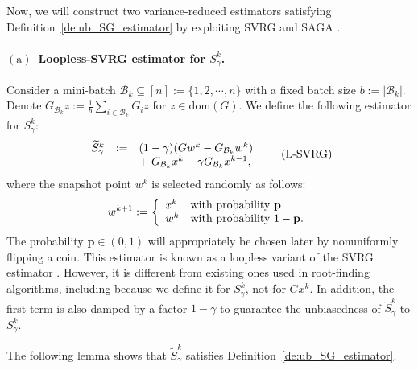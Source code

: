 \documentclass{article}
\newcommand{\sets}[1]{\{#1\}}
\newcommand{\dom}[1]{\mathrm{dom}(#1)}
\newcommand{\Bc}{\mathcal{B}}
\newcommand{\mbf}[1]{\mathbf{#1}}
\newcommand{\beforepara}{\vspace{-1.5ex}}
\theoremstyle{plain}
\theoremstyle{definition}
\theoremstyle{remark}
\begin{document}
Now, we will construct two variance-reduced estimators satisfying Definition~\ref{de:ub_SG_estimator} by exploiting SVRG \citep{SVRG} and SAGA \citep{Defazio2014}. 

\beforepara
\paragraph{$\mathrm{(a)}$~Loopless-SVRG estimator for $S^k_{\gamma}$.}\label{subsec:SVRG_estimator}
Consider a mini-batch $\Bc_k \subseteq [n] := \sets{1,2,\cdots, n}$ with a fixed batch size $b := \vert \Bc_k\vert$.
Denote $G_{\Bc_k}z := \frac{1}{b}\sum_{i \in \Bc_k}G_iz$ for $z\in\dom{G}$.
We define the following estimator for $S_{\gamma}^k$:
\vspace{-1ex}
\begin{equation}\label{eq:SVRG_estimator}
\begin{array}{lcl}
\widetilde{S}_{\gamma}^k & := &   (1-\gamma )( Gw^k  - G_{\Bc_k}w^k ) \\
&& + {~} G_{\Bc_k}x^k - \gamma G_{\Bc_k}x^{k-1}, 
\end{array}
\tag{L-SVRG}
\vspace{-1ex}
\end{equation}
where the snapshot point $w^k$ is selected randomly as follows:
\vspace{-0.75ex}
\begin{equation}\label{eq:SG_estimator_w}
w^{k+1} := \left\{\begin{array}{ll}
x^{k} &\text{with probability $\mbf{p}$}\\
w^k & \text{with probability $1 - \mbf{p}$}.
\end{array}\right.
\vspace{-0.75ex}
\end{equation}
The probability $\mbf{p} \in (0, 1)$ will appropriately be chosen later by nonuniformly flipping a coin.
This estimator is known as a loopless variant  \citep{kovalev2019don} of the SVRG estimator \citep{SVRG}.
However, it is different from existing ones used in root-finding algorithms, including \cite{davis2022variance} because we define it for $S_{\gamma}^k$, not for $Gx^k$.
In addition, the first term is also damped by a factor $1-\gamma$ to guarantee the unbiasedness of $\widetilde{S}_{\gamma}^k$ to $S_{\gamma}^k$.

The following lemma shows that $\widetilde{S}_{\gamma}^k$ satisfies Definition~\ref{de:ub_SG_estimator}.
\end{document}
